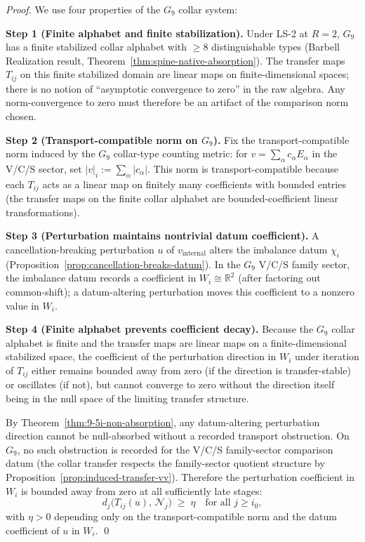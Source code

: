 \documentclass[12pt,oneside]{amsbook}
\theoremstyle{plain}
\theoremstyle{definition}
\theoremstyle{remark}
\begin{document}
\begin{proof}
We use four properties of the $G_9$ collar system:

\textbf{Step 1 (Finite alphabet and finite stabilization).}
Under LS-2 at $R=2$, $G_9$ has a finite stabilized collar alphabet
with $\geq 8$ distinguishable types (Barbell Realization result,
Theorem~\ref{thm:spine-native-absorption}).  The transfer maps
$T_{ij}$ on this finite stabilized domain are linear maps on
finite-dimensional spaces; there is no notion of ``asymptotic
convergence to zero'' in the raw algebra.  Any norm-convergence to
zero must therefore be an artifact of the comparison norm chosen.

\textbf{Step 2 (Transport-compatible norm on $G_9$).}
Fix the transport-compatible norm induced by the $G_9$ collar-type
counting metric: for $v = \sum_\alpha c_\alpha E_\alpha$ in the
V/C/S sector, set $|v|_i := \sum_\alpha |c_\alpha|$.  This norm
is transport-compatible because each $T_{ij}$ acts as a linear
map on finitely many coefficients with bounded entries (the transfer
maps on the finite collar alphabet are bounded-coefficient linear
transformations).

\textbf{Step 3 (Perturbation maintains nontrivial datum coefficient).}
A cancellation-breaking perturbation $u$ of $v_{\mathrm{internal}}$
alters the imbalance datum $\chi_i$ (Proposition~\ref{prop:cancellation-breaks-datum}).
In the $G_9$ V/C/S family sector, the imbalance datum records a
coefficient in $W_i \cong \mathbb{R}^2$ (after factoring out common-shift);
a datum-altering perturbation moves this coefficient to a nonzero
value in $W_i$.

\textbf{Step 4 (Finite alphabet prevents coefficient decay).}
Because the $G_9$ collar alphabet is finite and the transfer maps
are linear maps on a finite-dimensional stabilized space, the
coefficient of the perturbation direction in $W_i$ under iteration of
$T_{ij}$ either remains bounded away from zero (if the direction is
transfer-stable) or oscillates (if not), but cannot converge to zero
without the direction itself being in the null space of the limiting
transfer structure.

By Theorem~\ref{thm:9-5i-non-absorption}, any datum-altering
perturbation direction cannot be null-absorbed without a recorded
transport obstruction.  On $G_9$, no such obstruction is recorded
for the V/C/S family-sector comparison datum (the collar transfer
respects the family-sector quotient structure by
Proposition~\ref{prop:induced-transfer-vv}).  Therefore the
perturbation coefficient in $W_i$ is bounded away from zero at all
sufficiently late stages:
\[
  d_j\!\bigl(T_{ij}(u),\,\mathcal{N}_j\bigr) \;\geq\; \eta
  \quad\text{for all } j \geq i_0,
\]
with $\eta > 0$ depending only on the transport-compatible norm and
the datum coefficient of $u$ in $W_i$. \qed
\end{proof}
\end{document}
